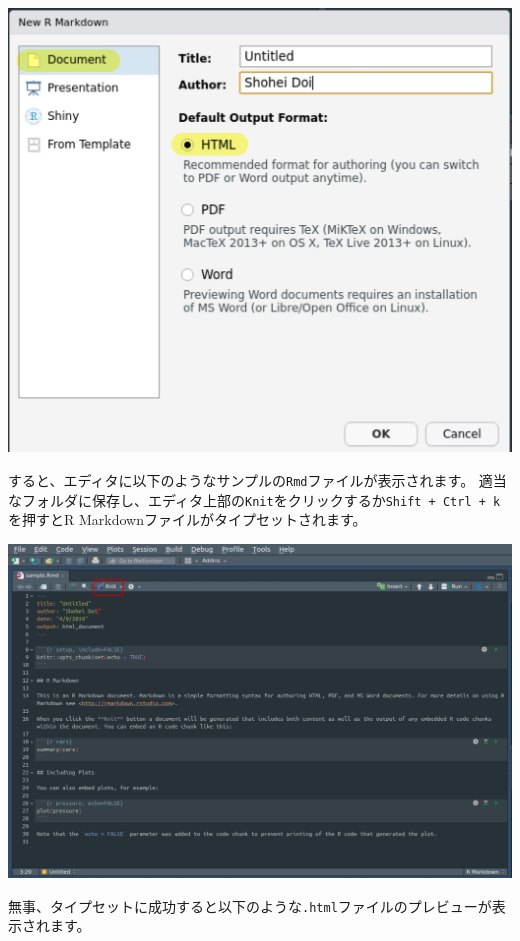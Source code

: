 \documentclass[]{bxjsreport}
\begin{document}
\includegraphics{figures/rmarkdown_html2.jpg}

すると、エディタに以下のようなサンプルの\texttt{Rmd}ファイルが表示されます。
適当なフォルダに保存し、エディタ上部の\texttt{Knit}をクリックするか\texttt{Shift\ +\ Ctrl\ +\ k}を押すとR Markdownファイルがタイプセットされます。

\includegraphics{figures/rmarkdown_html3.jpg}

無事、タイプセットに成功すると以下のような\texttt{.html}ファイルのプレビューが表示されます。
\end{document}
